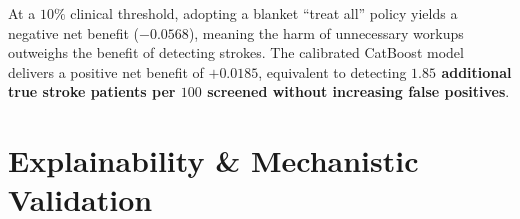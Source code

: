 \documentclass[conference]{IEEEtran}
\begin{document}
\begin{table}[t]
\centering
\caption{Stage 5: Decision Curve Analysis (Net Benefit)}
\label{tab:dca}
\end{table}

At a $10\%$ clinical threshold, adopting a blanket ``treat all'' policy yields a negative net benefit ($-0.0568$), meaning the harm of unnecessary workups outweighs the benefit of detecting strokes. The calibrated CatBoost model delivers a positive net benefit of $+0.0185$, equivalent to detecting \textbf{$1.85$ additional true stroke patients per $100$ screened without increasing false positives}.

\section{Explainability \& Mechanistic Validation}
\end{document}
